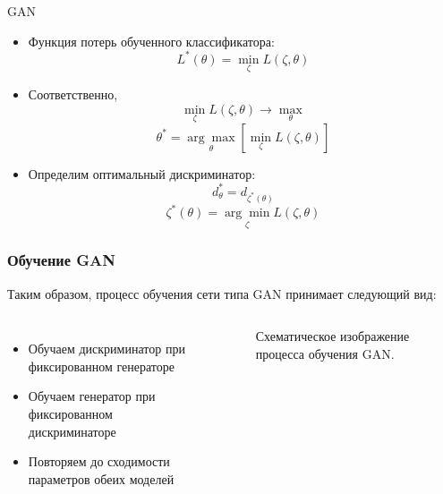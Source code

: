 \documentclass[12pt]{beamer}
\begin{document}
\begin{frame}{GAN}
	\begin{itemize}
		\item Функция потерь обученного классификатора:
		$$ L^*(\theta) = \underset{\zeta}{\min} L(\zeta, \theta) $$
		\item Соответственно,
		$$ \underset{\zeta}{\min} L(\zeta, \theta) \longrightarrow \underset{\theta}{\max} $$
		$$ \theta^* = \underset{\theta}{\arg\max} \left[ \underset{\zeta}{\min} L(\zeta, \theta) \right] $$
		 \item Определим оптимальный дискриминатор:
		 $$ d^*_{\theta} = d_{\zeta^*(\theta)} $$
		 $$ \zeta^*(\theta) =  \underset{\zeta}{\arg\min} L(\zeta, \theta)$$
	\end{itemize}
\end{frame}

\begin{frame}\frametitle{Обучение GAN}
	Таким образом, процесс обучения сети типа GAN принимает следующий вид:
	\begin{columns}
			\begin{itemize}
				\item Обучаем дискриминатор при фиксированном генераторе
				\item Обучаем генератор при фиксированном дискриминаторе
				\item Повторяем до сходимости параметров обеих моделей
			\end{itemize}
			\begin{figure}
				\caption{Схематическое изображение процесса обучения GAN.}
				\label{gan-train}
			\end{figure}
	\end{columns}
\end{frame}
\end{document}
